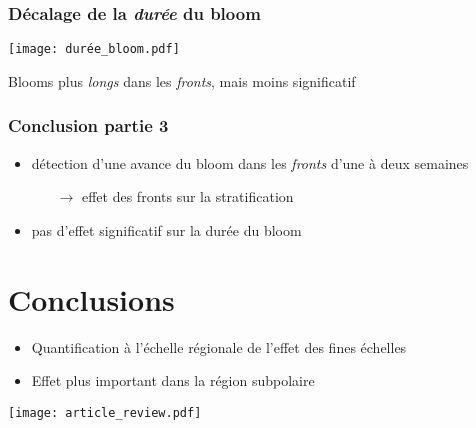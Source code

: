 \documentclass[11pt, french, aspectratio=32]{beamer}
\begin{document}

\begin{frame}
  \frametitle{Décalage de la \emph{\textit{durée}} du bloom}
  \texttt{[image: durée\_bloom.pdf]}

  \vfill

  Blooms plus \emph{longs} dans les \emph{fronts}, mais moins significatif
\end{frame}


\begin{frame}
  \frametitle{Conclusion partie 3}
  \vfill
  \begin{itemize}
          \setlength{\itemsep}{3em}
    \item détection d'une avance du bloom dans les \emph{fronts} d'une à deux semaines
          \begin{itemize}
            \item[$\longrightarrow$] effet des fronts sur la stratification
          \end{itemize}
    \item pas d'effet significatif sur la durée du bloom
  \end{itemize}
  \vfill
\end{frame}


\section{Conclusions}

\begin{frame}


  \begin{itemize}
          \setlength{\itemsep}{0.8em}
    \item Quantification à l'échelle régionale de l'effet des fines échelles
    \item Effet plus important dans la région subpolaire
  \end{itemize}


  \texttt{[image: article\_review.pdf]}

\end{frame}
\end{document}

